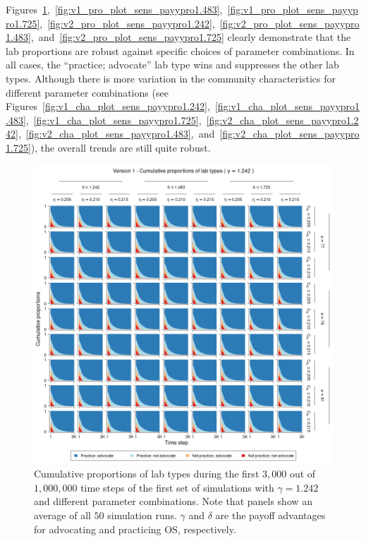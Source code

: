 \documentclass[meta, authordate]{jote-new-article}
\begin{document}
Figures~\ref{fig:v1_pro_plot_sens_payypro1.242},~\ref{fig:v1_pro_plot_sens_payypro1.483},~\ref{fig:v1_pro_plot_sens_payypro1.725},~\ref{fig:v2_pro_plot_sens_payypro1.242},~\ref{fig:v2_pro_plot_sens_payypro1.483},~and~\ref{fig:v2_pro_plot_sens_payypro1.725} clearly demonstrate that the lab proportions are robust against specific choices of parameter combinations. In all cases, the ``practice; advocate'' lab type wins and suppresses the other lab types. Although there is more variation in the community characteristics for different parameter combinations (see Figures~\ref{fig:v1_cha_plot_sens_payypro1.242},~\ref{fig:v1_cha_plot_sens_payypro1.483},~\ref{fig:v1_cha_plot_sens_payypro1.725},~\ref{fig:v2_cha_plot_sens_payypro1.242},~\ref{fig:v2_cha_plot_sens_payypro1.483},~and~\ref{fig:v2_cha_plot_sens_payypro1.725}), the overall trends are still quite robust.
%
\begin{figure}
  \begin{fullwidth}

    \centering
    \includegraphics[width=\textwidth]{v1_pro_plot_sens_payypro1.242.png}
    \caption{Cumulative proportions of lab types during the first $3,000$ out of $1,000,000$ time steps of the first set of simulations with $\gamma=1.242$ and different parameter combinations. Note that panels show an average of all $50$ simulation runs. $\gamma$ and $\delta$ are the payoff advantages for advocating and practicing OS, respectively.}
    \label{fig:v1_pro_plot_sens_payypro1.242}
  \end{fullwidth}
\end{figure}
\end{document}
